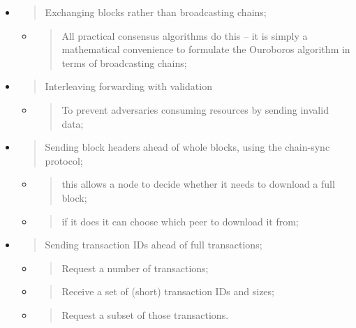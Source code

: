\documentclass[11pt,a4paper]{article}
\begin{document}
\begin{itemize}
\item
  \begin{quote}
  Exchanging blocks rather than broadcasting chains;
  \end{quote}

  \begin{itemize}
  \item
    \begin{quote}
    All practical consensus algorithms do this -- it is simply a
    mathematical convenience to formulate the Ouroboros algorithm in
    terms of broadcasting chains;
    \end{quote}
  \end{itemize}
\item
  \begin{quote}
  Interleaving forwarding with validation
  \end{quote}

  \begin{itemize}
  \item
    \begin{quote}
    To prevent adversaries consuming resources by sending invalid data;
    \end{quote}
  \end{itemize}
\item
  \begin{quote}
  Sending block headers ahead of whole blocks, using the chain-sync
  protocol;
  \end{quote}

  \begin{itemize}
  \item
    \begin{quote}
    this allows a node to decide whether it needs to download a full
    block;
    \end{quote}
  \item
    \begin{quote}
    if it does it can choose which peer to download it from;
    \end{quote}
  \end{itemize}
\item
  \begin{quote}
  Sending transaction IDs ahead of full transactions;
  \end{quote}

  \begin{itemize}
  \item
    \begin{quote}
    Request a number of transactions;
    \end{quote}
  \item
    \begin{quote}
    Receive a set of (short) transaction IDs and sizes;
    \end{quote}
  \item
    \begin{quote}
    Request a subset of those transactions.
    \end{quote}
  \end{itemize}
\end{itemize}
\end{document}
